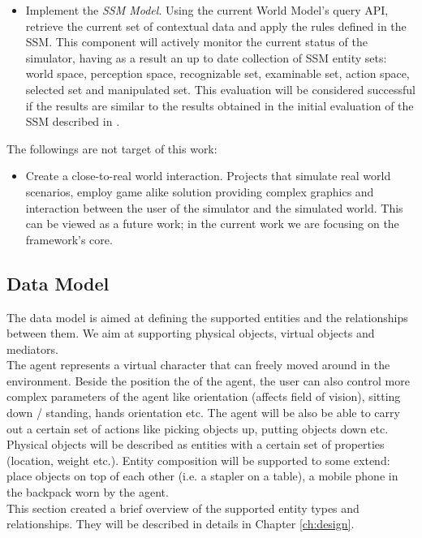 \begin{enumerate}
\begin{itemize}
			\item Implement the \emph{SSM Model}. Using the current World Model's query API, retrieve the current set of contextual data and apply the rules defined in the SSM. This component will actively monitor the current status of the simulator, having as a result an up to date collection of SSM entity sets: world space, perception space, recognizable set, examinable set, action space, selected set and manipulated set. This evaluation will be considered successful if the results are similar to the results obtained in the initial evaluation of the SSM described in \cite{pederson2011situative}.
		\end{itemize}
\end{enumerate}

The followings are not target of this work:
\begin{itemize}
	\item Create a close-to-real world interaction. Projects that simulate real world scenarios, employ game alike solution providing complex graphics and interaction between the user of the simulator and the simulated world. This can be viewed as a future work; in the current work we are focusing on the framework's core.
\end{itemize}

\subsection{Data Model}\label{sec:data_model}
The data model is aimed at defining the supported entities and the relationships between them. We aim at supporting  physical objects, virtual objects and mediators.\\

The agent represents a virtual character that can freely moved around in the environment. Beside the position the of the agent, the user can also control more complex parameters of the agent like orientation (affects field of vision), sitting down / standing, hands orientation etc. The agent will be also be able to carry out a certain set of actions like picking objects up, putting objects down etc.\\

Physical objects will be described as entities with a certain set of properties (location, weight etc.). Entity composition will be supported to some extend: place objects on top of each other (i.e. a stapler on a table), a mobile phone in the backpack worn by the agent.\\

This section created a brief overview of the supported entity types and relationships. They will be described in details in Chapter \ref{ch:design}.
